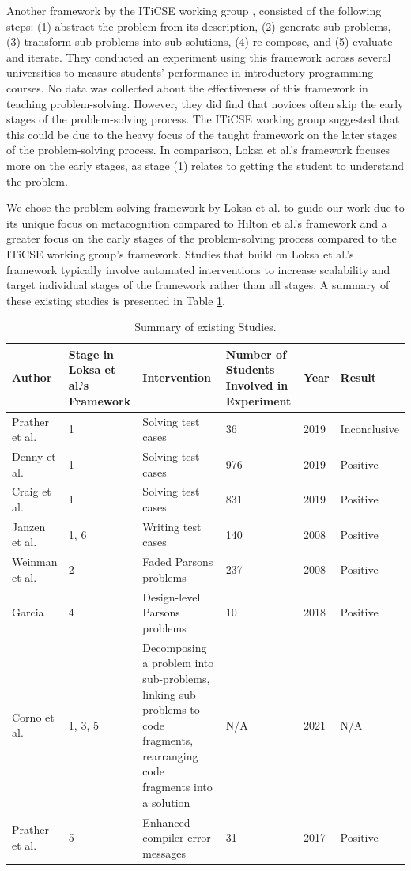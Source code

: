 \documentclass[sigconf,authorversion,nonacm]{acmart}
\begin{document}
Another framework by the ITiCSE working group \cite{mccracken2001}, consisted of the following steps: (1) abstract the problem from its description, (2) generate sub-problems, (3) transform sub-problems into sub-solutions, (4) re-compose, and (5) evaluate and iterate. They conducted an experiment using this framework across several universities to measure students' performance in introductory programming courses. No data was collected about the effectiveness of this framework in teaching problem-solving. However, they did find that novices often skip the early stages of the problem-solving process. The ITiCSE working group suggested that this could be due to the heavy focus of the taught framework on the later stages of the problem-solving process. In comparison, Loksa et al.’s framework focuses more on the early stages, as stage (1) relates to getting the student to understand the problem.

We chose the problem-solving framework by Loksa et al. to guide our work due to its unique focus on metacognition compared to Hilton et al.'s framework and a greater focus on the early stages of the problem-solving process compared to the ITiCSE working group's framework. Studies that build on Loksa et al.'s framework typically involve automated interventions to increase scalability and target individual stages of the framework rather than all stages. A summary of these existing studies is presented in Table \ref{tab:existingStudies}.

\begin{table}
  \caption{Summary of existing Studies.}
  \label{tab:existingStudies}
  \begin{tabular}{p{15mm}p{25mm}p{55mm}p{25mm}p{20mm}p{15mm}}
    \toprule
    Author&Stage in Loksa et al.'s Framework&Intervention&Number of Students Involved in Experiment&Year&Result\\
    \midrule
    Prather et al. \cite{prather2019}&1& Solving test cases&36&2019&Inconclusive\\
    \midrule
    Denny et al. \cite{denny2019}&1&Solving test cases&976&2019&Positive\\
    \midrule
    Craig et al. \cite{craig2019}&1&Solving test cases&831&2019&Positive\\
    \midrule
    Janzen et al. \cite{janzen2008}&1, 6&Writing test cases&140&2008&Positive\\
    \midrule
    Weinman et al. \cite{weinman2021}&2&Faded Parsons problems&237&2008&Positive\\
    \midrule
    Garcia \cite{garcia2021}&4&Design-level Parsons problems&10&2018&Positive\\
    \midrule
    Corno et al. \cite{corno2021}& 1, 3, 5&Decomposing a problem into sub-problems, linking sub-problems to code fragments, rearranging code fragments into a solution&N/A&2021&N/A\\
    \midrule
    Prather et al. \cite{prather2017}&5&Enhanced compiler error messages&31&2017&Positive \\
    \bottomrule
  \end{tabular}
\end{table}
\end{document}
